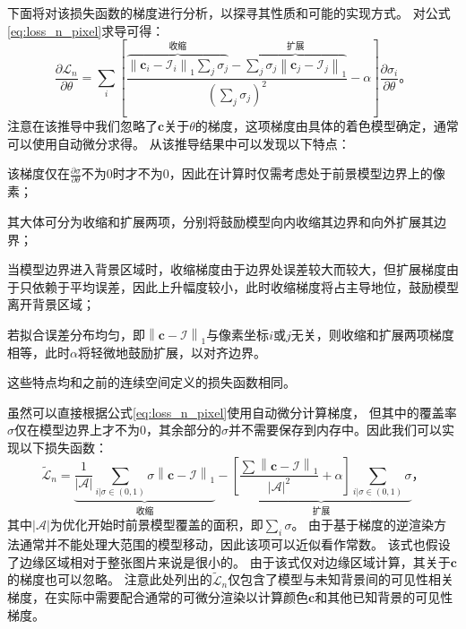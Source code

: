 下面将对该损失函数的梯度进行分析，以探寻其性质和可能的实现方式。
对公式\eqref{eq:loss_n_pixel}求导可得：
\begin{equation}
\frac{\partial\mathcal{L}_n}{\partial\theta} =
\sum_{i}\left[
    \frac{
        \overbrace{\textstyle \left\| \mathbf{c}_i - \mathcal{I}_i \right\|_1 \sum_j\sigma_j}^\text{收缩} -
        \overbrace{\textstyle \sum_j \sigma_j \left\| \mathbf{c}_j - \mathcal{I}_j \right\|_1}^\text{扩展}
    }{\left(\sum_j\sigma_j\right)^2} - \alpha
\right]\frac{\partial\sigma_i}{\partial\theta}
\text{。}
\end{equation}
注意在该推导中我们忽略了$\mathbf{c}$关于$\theta$的梯度，这项梯度由具体的着色模型确定，通常可以使用自动微分求得。
从该推导结果中可以发现以下特点：
\begin{enumerate*}
    \item 该梯度仅在$\frac{\partial\sigma}{\partial\theta}$不为0时才不为0，因此在计算时仅需考虑处于前景模型边界上的像素；
    \item 其大体可分为收缩和扩展两项，分别将鼓励模型向内收缩其边界和向外扩展其边界；
    \item 当模型边界进入背景区域时，收缩梯度由于边界处误差较大而较大，但扩展梯度由于只依赖于平均误差，因此上升幅度较小，此时收缩梯度将占主导地位，鼓励模型离开背景区域；
    \item 若拟合误差分布均匀，即$\left\|\mathbf{c} - \mathcal{I}\right\|_1$与像素坐标$i$或$j$无关，则收缩和扩展两项梯度相等，此时$\alpha$将轻微地鼓励扩展，以对齐边界。
\end{enumerate*}
这些特点均和之前的连续空间定义的损失函数相同。

虽然可以直接根据公式\eqref{eq:loss_n_pixel}使用自动微分计算梯度，
但其中的覆盖率$\sigma$仅在模型边界上才不为0，其余部分的$\sigma$并不需要保存到内存中。因此我们可以实现以下损失函数：
\begin{equation}
\tilde{\mathcal{L}}_n =
\underbrace{\frac{1}{|\mathcal{A}|}\sum_{i|\sigma\in(0,1)} \sigma\left\| \mathbf{c} - \mathcal{I} \right\|_1}_{\text{收缩}} -
\underbrace{\left[\frac{\sum\left\| \mathbf{c} - \mathcal{I} \right\|_1}{|\mathcal{A}|^2}+\alpha\right]\sum_{i|\sigma\in(0,1)} \sigma}_{\text{扩展}}
\text{，}
\label{eq:loss_n_tilde}
\end{equation}
其中$|\mathcal{A}|$为优化开始时前景模型覆盖的面积，即$\sum_{i} \sigma$。
由于基于梯度的逆渲染方法通常并不能处理大范围的模型移动，因此该项可以近似看作常数。
该式也假设了边缘区域相对于整张图片来说是很小的。
由于该式仅对边缘区域计算，其关于$\mathbf{c}$的梯度也可以忽略。
注意此处列出的$\tilde{\mathcal{L}}_n$仅包含了模型与未知背景间的可见性相关梯度，在实际中需要配合通常的可微分渲染以计算颜色$\mathbf{c}$和其他已知背景的可见性梯度。

